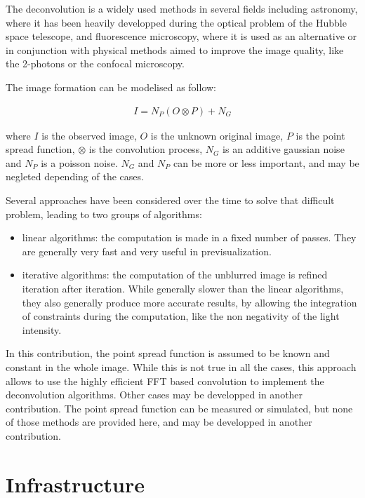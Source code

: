 \documentclass{InsightArticle}
\begin{document}
The deconvolution is a widely used methods in several fields including astronomy, where it has been heavily developped
during the optical problem of the Hubble space telescope, and fluorescence microscopy, where it is used as an alternative
or in conjunction with physical methods aimed to improve the image quality, like the 2-photons or the confocal microscopy.

The image formation can be modelised as follow:


\begin{eqnarray}
\label{eq:imageFormation}
I = N_P( O \otimes P ) + N_G
\end{eqnarray}

where $I$ is the observed image, $O$ is the unknown original image, $P$ is the point spread function, $\otimes$ is the convolution process,
$N_G$ is an additive gaussian noise and $N_P$ is a poisson noise. $N_G$ and $N_P$ can be more or less important, and may be negleted
depending of the cases.

Several approaches have been considered over the time to solve that difficult problem, leading to two groups of algorithms:

\begin{itemize}
 \item linear algorithms: the computation is made in a fixed number of passes. They are generally very fast and very useful in previsualization.
 \item iterative algorithms: the computation of the unblurred image is refined iteration after iteration. While generally slower
 than the linear algorithms, they also generally produce more accurate results, by allowing the integration
of constraints during the computation, like the non negativity of the light intensity.
\end{itemize}

In this contribution, the point spread function is assumed to be known and constant in the whole image. While this is not
true in all the cases, this approach allows to use the highly efficient FFT based convolution to implement the deconvolution
algorithms. Other cases may be developped in another contribution. The point spread function can be measured or simulated, but
none of those methods are provided here, and may be developped in another contribution.

\section{Infrastructure}
\end{document}
